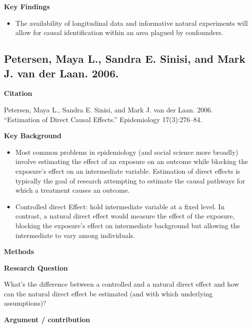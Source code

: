 \documentclass[
]{book}
\providecommand{\tightlist}{%
  \setlength{\itemsep}{0pt}\setlength{\parskip}{0pt}}
\begin{document}
\textbf{Key Findings}

\begin{itemize}
\tightlist
\item
  The availability of longitudinal data and informative natural experiments will allow for causal identification within an area plagued by confounders.
\end{itemize}

\hypertarget{petersen-maya-l.-sandra-e.-sinisi-and-mark-j.-van-der-laan.-2006.}{%
\subsection*{Petersen, Maya L., Sandra E. Sinisi, and Mark J. van der Laan. 2006.}\label{petersen-maya-l.-sandra-e.-sinisi-and-mark-j.-van-der-laan.-2006.}}

\textbf{Citation}

Petersen, Maya L., Sandra E. Sinisi, and Mark J. van der Laan. 2006. ``Estimation of Direct Causal Effects.'' Epidemiology 17(3):276--84.

\textbf{Key Background}

\begin{itemize}
\tightlist
\item
  Most common problems in epidemiology (and social science more broadly) involve estimating the effect of an exposure on an outcome while blocking the exposure's effect on an intermediate variable. Estimation of direct effects is typically the goal of research attempting to estimate the causal pathways for which a treatment causes an outcome.
\item
  Controlled direct Effect: hold intermediate variable at a fixed level. In contrast, a natural direct effect would measure the effect of the exposure, blocking the exposure's effect on intermediate background but allowing the intermediate to vary among individuals.
\end{itemize}

\textbf{Methods}

\textbf{Research Question}

What's the difference between a controlled and a natural direct effect and how can the natural direct effect be estimated (and with which underlying assumptions)?

\textbf{Argument / contribution}
\end{document}

